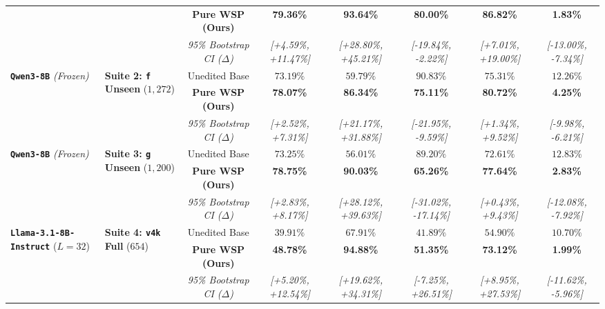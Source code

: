 \documentclass[10pt,twocolumn]{article}
\begin{document}
\begin{table}[t]
{\begin{tabular}{llcccccc}
 & & \textbf{Pure WSP (Ours)} & \textbf{79.36\%} & \textbf{93.64\%} & \textbf{80.00\%} & \textbf{86.82\%} & \textbf{1.83\%} \\
 & & \emph{95\% Bootstrap CI ($\Delta$)} & \textcolor{green!50!black}{\emph{[+4.59\%, +11.47\%]}} & \textcolor{green!50!black}{\emph{[+28.80\%, +45.21\%]}} & \emph{[-19.84\%, -2.22\%]} & \textcolor{green!50!black}{\emph{[+7.01\%, +19.00\%]}} & \textcolor{green!50!black}{\emph{[-13.00\%, -7.34\%]}} \\
\midrule
\multirow{3}{*}{\textbf{\texttt{Qwen3-8B}} \emph{(Frozen)}} & \multirow{3}{*}{\textbf{Suite 2: \texttt{f} Unseen} ($1,272$)} & Unedited Base & $73.19\%$ & $59.79\%$ & $90.83\%$ & $75.31\%$ & $12.26\%$ \\
 & & \textbf{Pure WSP (Ours)} & \textbf{78.07\%} & \textbf{86.34\%} & \textbf{75.11\%} & \textbf{80.72\%} & \textbf{4.25\%} \\
 & & \emph{95\% Bootstrap CI ($\Delta$)} & \textcolor{green!50!black}{\emph{[+2.52\%, +7.31\%]}} & \textcolor{green!50!black}{\emph{[+21.17\%, +31.88\%]}} & \emph{[-21.95\%, -9.59\%]} & \textcolor{green!50!black}{\emph{[+1.34\%, +9.52\%]}} & \textcolor{green!50!black}{\emph{[-9.98\%, -6.21\%]}} \\
\midrule
\multirow{3}{*}{\textbf{\texttt{Qwen3-8B}} \emph{(Frozen)}} & \multirow{3}{*}{\textbf{Suite 3: \texttt{g} Unseen} ($1,200$)} & Unedited Base & $73.25\%$ & $56.01\%$ & $89.20\%$ & $72.61\%$ & $12.83\%$ \\
 & & \textbf{Pure WSP (Ours)} & \textbf{78.75\%} & \textbf{90.03\%} & \textbf{65.26\%} & \textbf{77.64\%} & \textbf{2.83\%} \\
 & & \emph{95\% Bootstrap CI ($\Delta$)} & \textcolor{green!50!black}{\emph{[+2.83\%, +8.17\%]}} & \textcolor{green!50!black}{\emph{[+28.12\%, +39.63\%]}} & \emph{[-31.02\%, -17.14\%]} & \textcolor{green!50!black}{\emph{[+0.43\%, +9.43\%]}} & \textcolor{green!50!black}{\emph{[-12.08\%, -7.92\%]}} \\
\midrule
\multirow{3}{*}{\textbf{\texttt{Llama-3.1-8B-Instruct}} ($L=32$)} & \multirow{3}{*}{\textbf{Suite 4: \texttt{v4k} Full} ($654$)} & Unedited Base & $39.91\%$ & $67.91\%$ & $41.89\%$ & $54.90\%$ & $10.70\%$ \\
 & & \textbf{Pure WSP (Ours)} & \textbf{48.78\%} & \textbf{94.88\%} & \textbf{51.35\%} & \textbf{73.12\%} & \textbf{1.99\%} \\
 & & \emph{95\% Bootstrap CI ($\Delta$)} & \textcolor{green!50!black}{\emph{[+5.20\%, +12.54\%]}} & \textcolor{green!50!black}{\emph{[+19.62\%, +34.31\%]}} & \textcolor{green!50!black}{\emph{[-7.25\%, +26.51\%]}} & \textcolor{green!50!black}{\emph{[+8.95\%, +27.53\%]}} & \textcolor{green!50!black}{\emph{[-11.62\%, -5.96\%]}} \\
\bottomrule
\end{tabular}%
}
\label{tab:main}
\end{table}
\end{document}
